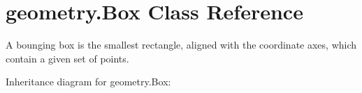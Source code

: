 \hypertarget{classgeometry_1_1Box}{}\section{geometry.\+Box Class Reference}
\label{classgeometry_1_1Box}


A bounging box is the smallest rectangle, aligned with the coordinate axes, which contain a given set of points.  




Inheritance diagram for geometry.\+Box\+:
